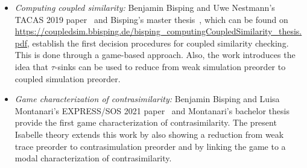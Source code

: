 \documentclass[10pt,a4paper]{article}
\begin{document}
\begin{itemize}
  \item \emph{Computing coupled similarity:} Benjamin Bisping and Uwe Nestmann's TACAS 2019 paper~%
    \cite{bn2019coupledsimTacas} and Bisping's master thesis~\cite{bisping2018coupledsim},
    which can be found on \url{https://coupledsim.bbisping.de/bisping_computingCoupledSimilarity_thesis.pdf},
    establish the first decision procedures for coupled similarity checking.
    This is done through a game-based approach.
    Also, the work introduces the idea that $\tau$-sinks can be used to reduce from weak simulation
    preorder to coupled simulation preorder.
  \item \emph{Game characterization of contrasimilarity:} Benjamin Bisping and Luisa Montanari's
    EXPRESS/SOS 2021 paper~\cite{bm2021contrasimilarity} and Montanari's bachelor thesis provide
    the first game characterization of contrasimilarity.
    The present Isabelle theory extends this work by also showing a reduction from weak trace preorder to
    contrasimulation preorder and by linking the game to a modal characterization of contrasimilarity.
\end{itemize}
\end{document}
